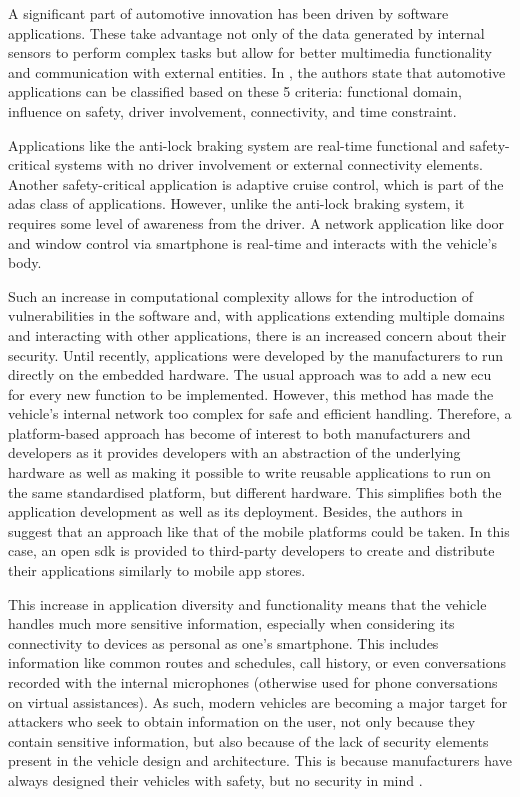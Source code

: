 A significant part of automotive innovation has been driven by software applications. These take advantage not only of the data generated by internal sensors to perform complex tasks but allow for better multimedia functionality and communication with external entities. In \cite{Le2018}, the authors state that automotive applications can be classified based on these 5 criteria: functional domain, influence on safety, driver involvement, connectivity, and time constraint.\par

Applications like the anti-lock braking system are real-time functional and safety-critical systems with no driver involvement or external connectivity elements. Another safety-critical application is adaptive cruise control, which is part of the \gls{adas} class of applications. However, unlike the anti-lock braking system, it requires some level of awareness from the driver. A network application like door and window control via smartphone is real-time and interacts with the vehicle’s body.\par
Such an increase in computational complexity allows for the introduction of vulnerabilities in the software and, with applications extending multiple domains and interacting with other applications, there is an increased concern about their security. Until recently, applications were developed by the manufacturers to run directly on the embedded hardware. The usual approach was to add a new \gls{ecu} for every new function to be implemented. However, this method has made the vehicle’s internal network too complex for safe and efficient handling. Therefore, a platform-based approach has become of interest to both manufacturers and developers as it provides developers with an abstraction of the underlying hardware as well as making it possible to write reusable applications to run on the same standardised platform, but different hardware. This simplifies both the application development as well as its deployment. Besides, the authors in \cite{Holle} suggest that an approach like that of the mobile platforms could be taken. In this case, an open \gls{sdk} is provided to third-party developers to create and distribute their applications similarly to mobile app stores.\par
This increase in application diversity and functionality means that the vehicle handles much more sensitive information, especially when considering its connectivity to devices as personal as one’s smartphone. This includes information like common routes and schedules, call history, or even conversations recorded with the internal microphones (otherwise used for phone conversations on virtual assistances). As such, modern vehicles are becoming a major target for attackers who seek to obtain information on the user, not only because they contain sensitive information, but also because of the lack of security elements present in the vehicle design and architecture. This is because manufacturers have always designed their vehicles with safety, but no security in mind \citep{Siegel2018}.

